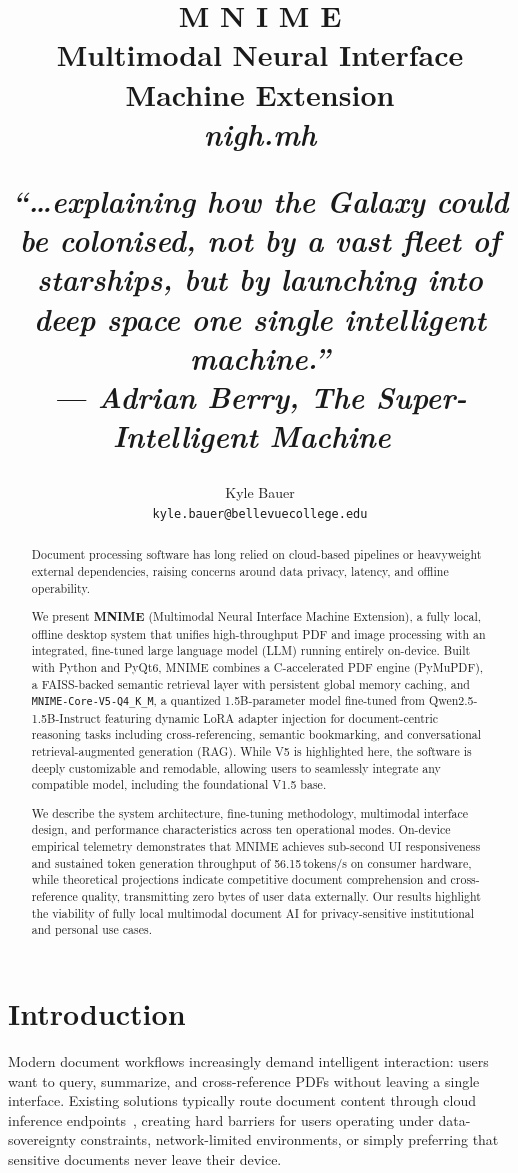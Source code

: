 \documentclass[11pt]{article}
\title{{\huge \textbf{M \hspace{2.0em} N \hspace{2.0em} I \hspace{2.0em} M \hspace{2.0em} E}}\\[0.45em]
{\large Multimodal Neural Interface Machine Extension}\\[0.25em]
{\normalsize \textit{nigh.mh}}\\[0.8em]
\parbox{0.82\textwidth}{\centering\small\normalfont\itshape ``\dots explaining how the Galaxy could be colonised, not by a vast fleet of starships, but by launching into deep space one single intelligent machine.''\\[0.3em]
{\footnotesize\normalfont --- Adrian Berry, \textit{The Super-Intelligent Machine}~\citep{berry1983superintelligent}}}}
\author{
  Kyle Bauer \\
  \texttt{kyle.bauer@bellevuecollege.edu}
}
\begin{document}
\maketitle

\begin{abstract}
Document processing software has long relied on cloud-based pipelines or
heavyweight external dependencies, raising concerns around data privacy,
latency, and offline operability.

We present \textbf{MNIME} (Multimodal Neural Interface Machine Extension),
a fully local, offline desktop system that unifies high-throughput PDF and
image processing with an integrated, fine-tuned large language model (LLM)
running entirely on-device.
Built with Python and PyQt6, MNIME combines a C-accelerated PDF engine
(PyMuPDF), a FAISS-backed semantic retrieval layer with persistent global memory caching, and
\texttt{MNIME-Core-V5-Q4\_K\_M}, a quantized 1.5B-parameter model
fine-tuned from Qwen2.5-1.5B-Instruct featuring dynamic LoRA adapter injection for document-centric reasoning tasks
including cross-referencing, semantic bookmarking, and conversational
retrieval-augmented generation (RAG). While V5 is highlighted here, the software is deeply customizable and remodable, allowing users to seamlessly integrate any compatible model, including the foundational V1.5 base.

We describe the system architecture, fine-tuning methodology, multimodal
interface design, and performance characteristics across ten operational modes.
On-device empirical telemetry demonstrates that MNIME achieves sub-second UI responsiveness
and sustained token generation throughput of 56.15\,tokens/s on consumer hardware,
while theoretical projections indicate competitive document comprehension and cross-reference
quality, transmitting zero bytes of user data externally.
Our results highlight the viability of fully local multimodal document AI
for privacy-sensitive institutional and personal use cases.
\end{abstract}

\newpage
\section{Introduction}
\label{sec:intro}

Modern document workflows increasingly demand intelligent interaction: users
want to query, summarize, and cross-reference PDFs without leaving a single
interface.
Existing solutions typically route document content through cloud inference
endpoints~\cite{openai2024gpt4,gemini2025}, creating hard barriers for users
operating under data-sovereignty constraints, network-limited environments,
or simply preferring that sensitive documents never leave their device.
\end{document}
